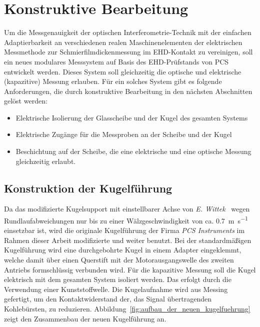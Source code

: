 \chapter{Konstruktive Bearbeitung}
\label{chap:konstruktive_bearbeitung}

Um die Messgenauigkeit der optischen Interferometrie-Technik mit der einfachen Adaptierbarkeit an verschiedenen realen Maschinenelementen der elektrischen Messmethode zur Schmierfilmdickenmessung im EHD-Kontakt zu vereinigen, soll ein neues modulares Messsystem auf Basis des EHD-Prüfstands von PCS entwickelt werden.
Dieses System soll gleichzeitig die optische und elektrische (kapazitive) Messung erlauben.
Für ein solches System gibt es folgende Anforderungen, die durch konstruktive Bearbeitung in den nächsten Abschnitten gelöst werden:

\begin{itemize}
    \item Elektrische Isolierung der Glasscheibe und der Kugel des gesamten Systems
    \item Elektrische Zugänge für die Messproben an der Scheibe und der Kugel
    \item Beschichtung auf der Scheibe, die eine elektrische und eine optische Messung gleichzeitig erlaubt.
\end{itemize}

\section{Konstruktion der Kugelführung}
\label{sec:konstruktion_der_kugelfuehrung}

Da das modifizierte Kugelsupport mit einstellbarer Achse von \textit{E. Wittek}~\cite{wittek_2007} wegen Rundlaufabweichungen nur bis zu einer Wälzgeschwindigkeit von ca. \SI[per-mode=symbol]{0.7}{\meter\per\second} einsetzbar ist, wird die originale Kugelführung der Firma \textit{PCS Instruments} im Rahmen dieser Arbeit modifizierte und weiter benutzt.
Bei der standardmäßigen Kugelführung wird eine durchgebohrte Kugel in einem Adapter eingeklemmt, welche damit über einen Querstift mit der Motorausgangswelle des zweiten Antriebs formschlüssig verbunden wird.
Für die kapazitive Messung soll die Kugel elektrisch mit dem gesamten System isoliert werden.
Das erfolgt durch die Verwendung einer Kunststoffwelle.
Die Kugelaufnahme wird aus Messing gefertigt, um den Kontaktwiderstand der, das Signal übertragenden Kohlebürsten, zu reduzieren.
Abbildung~\ref{fig:aufbau_der_neuen_kugelfuehrung} zeigt den Zusammenbau der neuen Kugelführung an.

